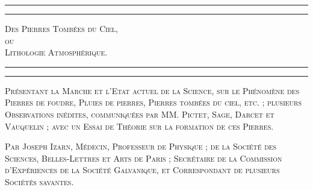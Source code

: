 \documentclass[a4paper, 11pt, oneside, polutonikogreek, french]{article}
\begin{document}
\begin{titlepage} %
	\centering %

	
	\rule{\textwidth}{1.6pt}\vspace*{-\baselineskip}\vspace*{2pt} %
	\rule{\textwidth}{0.4pt} %
	
	\vspace{1\baselineskip} %
	
	{\scshape\Huge Des Pierres Tombées du Ciel,\\ ou\\ Lithologie Atmosphérique.}
	
	\vspace{1\baselineskip} %

	\rule{\textwidth}{0.4pt}\vspace*{-\baselineskip}\vspace{3.2pt} %
	\rule{\textwidth}{1.6pt} %
	
	\vspace{1\baselineskip} %
	
	
	{\scshape \Large Présentant la Marche et l'Etat actuel de la Science, sur le Phénomène des Pierres de foudre, Pluies de pierres, Pierres tombées du ciel, etc. ; plusieurs Observations inédites, communiquées par MM. Pictet, Sage, Darcet et Vauquelin ; avec un Essai de Théorie sur la formation de ces Pierres.} %
	
	\vspace*{1\baselineskip} %
	
        {\scshape Par Joseph Izarn, Médecin, Professeur de Physique ; de la Société des Sciences, Belles-Lettres et Arts de Paris ; Secrétaire de la Commission d'Expériences de la Société Galvanique, et Correspondant de plusieurs Sociétés savantes. } %
    
        \vspace*{\fill}


\end{titlepage}
\end{document}
